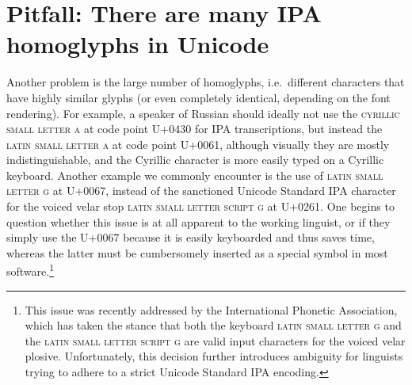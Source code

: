 \section{Pitfall: There are many IPA homoglyphs in Unicode}
\label{pitfall-there-are-many-ipa-homoglyphs-in-unicode}

Another problem is the large number of homoglyphs, i.e.~different characters
that have highly similar glyphs (or even completely identical, depending on the
font rendering). For example, a speaker of Russian should ideally not use the
\textsc{cyrillic small letter a} at code point U+0430 for IPA transcriptions,
but instead the \textsc{latin small letter a} at code point U+0061, although
visually they are mostly indistinguishable, and the Cyrillic character is more
easily typed on a Cyrillic keyboard. Another example we commonly encounter is
the use of \textsc{latin small letter g} at U+0067, instead of the sanctioned
Unicode Standard IPA character for the voiced velar stop \textsc{latin small
letter script g} at U+0261. One begins to question whether this issue is at all
apparent to the working linguist, or if they simply use the U+0067 because it is
easily keyboarded and thus saves time, whereas the latter must be cumbersomely
inserted as a special symbol in most software.\footnote{This issue was recently
addressed by the International Phonetic Association, which has taken the stance
that both the keyboard \textsc{latin small letter g} and the \textsc{latin small
letter script g} are valid input characters for the voiced velar plosive.
Unfortunately, this decision further introduces ambiguity for linguists trying
to adhere to a strict Unicode Standard IPA encoding.}

